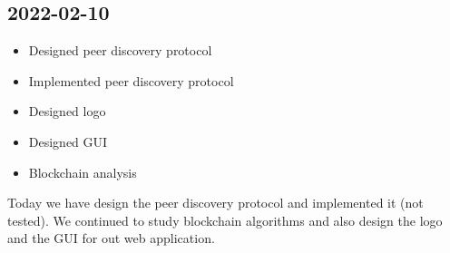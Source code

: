 \documentclass{article}
\begin{document}
\subsection*{2022-02-10}

\begin{itemize}
    \item Designed peer discovery protocol
    \item Implemented peer discovery protocol
    \item Designed logo
    \item Designed GUI
    \item Blockchain analysis
\end{itemize}

Today we have design the peer discovery protocol and implemented it (not tested).
We continued to study blockchain algorithms and also design the logo and the GUI for out web application.
\end{document}
